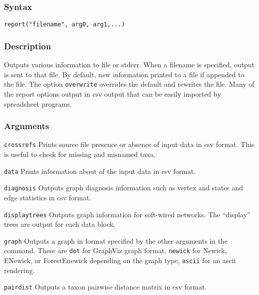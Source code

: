 \documentclass[11pt]{article}
\begin{document}
		\subsubsection{Syntax}
				\texttt{report("filename", arg0, arg1,...)}
		\subsubsection{Description}
			Outputs various information to file or stderr.  When a filename is specified, output is sent to that file.  By default, new information printed to a file
			if appended to the file.  The option \texttt{overwrite} overrides the default and rewrites the file.  Many of the report options output in csv output that
			can be easily imported by spreadsheet programs.
		\subsubsection{Arguments}
				\noindent \texttt{crossrefs} Prints source file presence or absence of input data in csv format.  This is useful to check for 
				missing and misnamed taxa.
			
				\smallskip
				\noindent \texttt{data} Prints information about of the input data in csv format.
				
				\smallskip
				\noindent \texttt{diagnosis}  Outputs graph diagnosis information such as vertex and states and edge statistics in csv format. 
			
				\smallskip
				\noindent \texttt{displaytrees}  Outputs graph information for soft-wired networks.  The ``display'' trees are output for each data block. 
				
				\smallskip
				\noindent \texttt{graph} Outputs a graph in format specified by the other arguments in the command.  These are \texttt{dot} for GraphViz graph format,
				\texttt{newick} for Newick, ENewick, or ForestEnewick depending on the graph type, \texttt{ascii} for an ascii rendering.  
				
				\smallskip
				\noindent \texttt{pairdist} Outputs a taxon pairwise distance matrix in csv format.  
				
\end{document}
